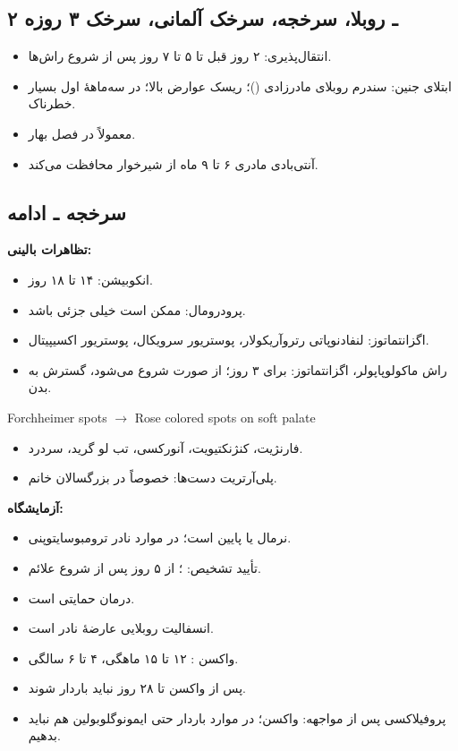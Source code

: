 \documentclass[12pt,a4paper]{article}
\begin{document}
\subsection*{۲ ـ روبلا، سرخجه، سرخک آلمانی، سرخک ۳ روزه}
\begin{itemize}
\item انتقال‌پذیری: ۲ روز قبل تا ۵ تا ۷ روز پس از شروع راش‌ها.
\item ابتلای جنین: سندرم روبلای مادرزادی ()؛ ریسک عوارض بالا؛ در سه‌ماههٔ اول بسیار خطرناک.
\item معمولاً در فصل بهار.
\item آنتی‌بادی مادری ۶ تا ۹ ماه از شیرخوار محافظت می‌کند.
\end{itemize}

\subsection*{سرخجه ـ ادامه}
\textbf{تظاهرات بالینی:}
\begin{itemize}
\item انکوبیشن: ۱۴ تا ۱۸ روز.
\item پرودرومال: ممکن است خیلی جزئی باشد.
\item اگزانتماتوز: لنفادنوپاتی رتروآریکولار، پوستریور سرویکال، پوستریور اکسیپیتال.
\item راش ماکولوپاپولر، اگزانتماتوز: برای ۳ روز؛ از صورت شروع می‌شود، گسترش به بدن.
\end{itemize}
\begin{latin}
Forchheimer spots \(\longrightarrow\) Rose colored spots on soft palate
\end{latin}
\begin{itemize}
\item فارنژیت، کنژنکتیویت، آنورکسی، تب لو گرید، سردرد.
\item پلی‌آرتریت دست‌ها: خصوصاً در بزرگسالان خانم.
\end{itemize}
\textbf{آزمایشگاه:}
\begin{itemize}
\item {} نرمال یا پایین است؛ در موارد نادر ترومبوسایتوپنی.
\item تأیید تشخیص: ؛ از ۵ روز پس از شروع علائم.
\end{itemize}
\begin{itemize}
\item درمان حمایتی است.
\item انسفالیت روبلایی عارضهٔ نادر است.
\item واکسن : ۱۲ تا ۱۵ ماهگی، ۴ تا ۶ سالگی.
\item پس از واکسن تا ۲۸ روز نباید باردار شوند.
\item پروفیلاکسی پس از مواجهه: واکسن؛ در موارد باردار حتی ایمونوگلوبولین هم نباید بدهیم.
\end{itemize}
\end{document}
